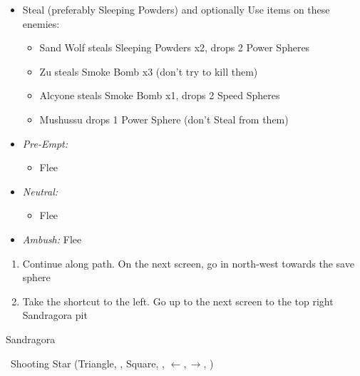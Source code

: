 \begin{encounters}
    \begin{itemize}
        \item Steal (preferably Sleeping Powders) and optionally Use items on these enemies:
        \begin{itemize}
            \item Sand Wolf steals Sleeping Powders x2, drops 2 Power Spheres
            \item Zu steals Smoke Bomb x3 (don't try to kill them)
            \item Alcyone steals Smoke Bomb x1, drops 2 Speed Spheres
            \item Mushussu drops 1 Power Sphere (don't Steal from them)
        \end{itemize}
        \item \textit{Pre-Empt:}
        \begin{itemize}
            \tidusf Defend
            \rikkuf Steal or Use a Smoke Bomb/Silence Grenade/Sleeping Powder
            \luluf Defend
            \item Flee
        \end{itemize}
        \item \textit{Neutral:}
        \begin{itemize}
            \switch{\tidus}{\kimahri}
            \kimahrif Steal
            \rikkuf Switch for \tidus\ or Use a Smoke Bomb/Silence Grenade/Sleeping Powder
            \item Flee
        \end{itemize}
        \item \textit{Ambush:} Flee
    \end{itemize}
\end{encounters}
\begin{enumerate}[resume]
    \item Continue along path. On the next screen, go in north-west towards the save sphere
    \item Take the shortcut to the left. Go up to the next screen to the top right Sandragora pit
\end{enumerate}
\begin{battle}{Sandragora}
    \begin{itemize}
        \switch{\tidus}{\auron}
        \auronf \od\ Shooting Star (Triangle, \Cancel, Square, \Confirm, $\leftarrow, \rightarrow$, \Confirm)
    \end{itemize}
\end{battle}
